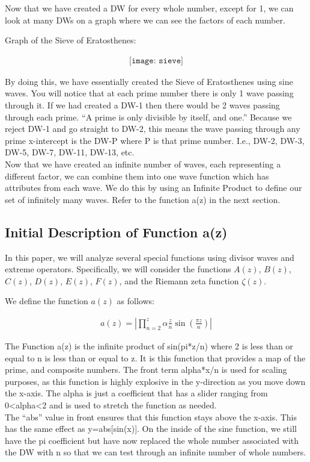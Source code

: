 \documentclass{article}
\begin{document}
Now that we have created a DW for every whole number, except for 1, we can look at many DWs on a graph where we can see the factors of each number.

Graph of the Sieve of Eratosthenes:

\begin{align*}
\texttt{[image: sieve]}
\end{align*}

By doing this, we have essentially created the Sieve of Eratosthenes using sine waves. You will notice that at each prime number there is only 1 wave passing through it. If we had created a    DW-1 then there would be 2 waves passing through each prime. “A prime is only divisible by itself, and one.” Because we reject DW-1 and go straight to DW-2, this means the wave passing through any prime x-intercept is the DW-P where P is that prime number. I.e., DW-2, DW-3, DW-5, DW-7, DW-11, DW-13, etc. \\ 
\newline
Now that we have created an infinite number of waves, each representing a different factor, we can combine them into one wave function which has attributes from each wave. We do this by using an Infinite Product to define our set of infinitely many waves. Refer to the function a(z) in the next section.

\subsection*{Initial Description of Function a(z)}
In this paper, we will analyze several special functions using divisor waves and extreme operators. Specifically, we will consider the functions $A(z)$, $B(z)$, $C(z)$, $D(z)$, $E(z)$, $F(z)$, and the Riemann zeta function $\zeta(z)$.

We define the function $a(z)$ as follows:

\begin{align*}
	a(z) = |\prod_{n=2}^z \alpha\frac{z}{n}\sin\left(\frac{\pi z}{n}\right)|
\end{align*} 
	
The Function a(z) is the infinite product of sin(pi*z/n) where 2 is less than or equal to n is less than or equal to z. It is this function that provides a map of the prime, and composite numbers. The front term alpha*x/n is used for scaling purposes, as this function is highly explosive in the y-direction as you move down the x-axis. The alpha is just a coefficient that has a slider ranging from 0<alpha<2 and is used to stretch the function as needed. \\
\newline
The “abs” value in front ensures that this function stays above the x-axis. This has the same effect as y=abs[sin(x)]. On the inside of the sine function, we still have the pi coefficient but have now replaced the whole number associated with the DW with n so that we can test through an infinite number of whole numbers. \\
\end{document}
